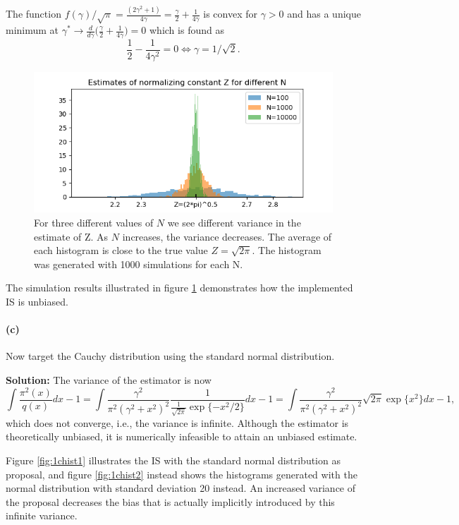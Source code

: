 \documentclass{article}
\begin{document}
The function $f(\gamma)/\sqrt{\pi} = \frac{(2\gamma^2+1)}{4\gamma }= \frac{\gamma}{2} + \frac{1}{4\gamma}$ is convex for $\gamma>0$ and has a unique minimum at $\gamma^*\rightarrow \frac{d}{d\gamma} \Big(\frac{\gamma}{2}+\frac{1}{4\gamma}\Big) =0$ which is found as
	\begin{equation}
		\dfrac{1}{2} - \dfrac{1}{4\gamma^2} = 0 \Leftrightarrow \gamma = 1/\sqrt{2}.
	\end{equation}
\begin{figure}
	\centering
	\includegraphics[width=0.7\linewidth]{1_b_hist_newg}
	\caption{For three different values of $N$ we see different variance in the estimate of Z. As $N$ increases, the variance decreases. The average of each histogram is close to the true value $Z=\sqrt{2\pi}$. The histogram was generated with 1000 simulations for each N.} 
	\label{fig:1bhist}
\end{figure}
The simulation results illustrated in figure \ref{fig:1bhist} demonstrates how the implemented IS is unbiased.

\paragraph{(c)} Now target the Cauchy distribution using the standard normal distribution.

\textbf{Solution: } The variance of the estimator is now
	\begin{equation}
		\int \dfrac{\pi^2(x)}{q(x)}dx - 1  = \int \dfrac{\gamma^2}{\pi^2(\gamma^2+x^2)^2}\dfrac{1}{\frac{1}{\sqrt{2\pi}}\exp\{-x^2/2\}}dx -1=\int \dfrac{\gamma^2}{\pi^2(\gamma^2+x^2)^2}\sqrt{2\pi}\exp\{x^2\}dx-1,
	\end{equation}
	which does not converge, i.e., the variance is infinite. Although the estimator is theoretically unbiased, it is numerically infeasible to attain an unbiased estimate.
	
%
Figure \ref{fig:1chist1} illustrates the IS with the standard normal distribution as proposal, and figure \ref{fig:1chist2} instead shows the histograms generated with the normal distribution with standard deviation 20 instead. An increased variance of the proposal decreases the bias that is actually implicitly introduced by this infinite variance.
\end{document}
